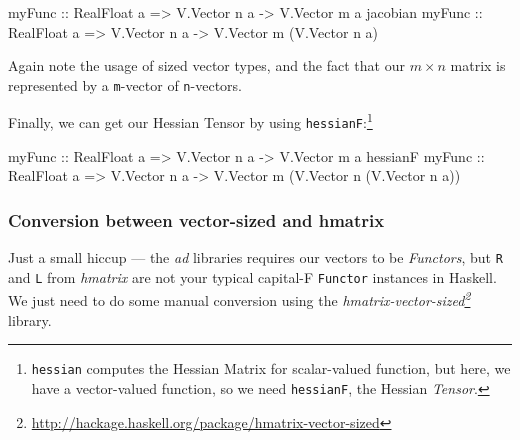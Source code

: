 \documentclass[]{article}
\newenvironment{Shaded}{}{}
\newcommand{\DataTypeTok}[1]{\textcolor[rgb]{0.56,0.13,0.00}{#1}}
\newcommand{\NormalTok}[1]{#1}
\newcommand{\OtherTok}[1]{\textcolor[rgb]{0.00,0.44,0.13}{#1}}
\renewcommand{\href}[2]{#2\footnote{\url{#1}}}
\begin{document}
\begin{Shaded}
\begin{Highlighting}[]
\OtherTok{myFunc          ::} \DataTypeTok{RealFloat}\NormalTok{ a }\OtherTok{=>} \DataTypeTok{V.Vector}\NormalTok{ n a }\OtherTok{{-}>} \DataTypeTok{V.Vector}\NormalTok{ m a}
\NormalTok{jacobian}\OtherTok{ myFunc ::} \DataTypeTok{RealFloat}\NormalTok{ a }\OtherTok{=>} \DataTypeTok{V.Vector}\NormalTok{ n a }\OtherTok{{-}>} \DataTypeTok{V.Vector}\NormalTok{ m (}\DataTypeTok{V.Vector}\NormalTok{ n a)}
\end{Highlighting}
\end{Shaded}

Again note the usage of sized vector types, and the fact that our \(m \times n\)
matrix is represented by a \texttt{m}-vector of \texttt{n}-vectors.

Finally, we can get our Hessian Tensor by using \texttt{hessianF}:\footnote{\texttt{hessian}
  computes the Hessian Matrix for scalar-valued function, but here, we have a
  vector-valued function, so we need \texttt{hessianF}, the Hessian
  \emph{Tensor}.}

\begin{Shaded}
\begin{Highlighting}[]
\NormalTok{myFunc}
\OtherTok{    ::} \DataTypeTok{RealFloat}\NormalTok{ a }\OtherTok{=>} \DataTypeTok{V.Vector}\NormalTok{ n a }\OtherTok{{-}>} \DataTypeTok{V.Vector}\NormalTok{ m a}
\NormalTok{hessianF myFunc}
\OtherTok{    ::} \DataTypeTok{RealFloat}\NormalTok{ a }\OtherTok{=>} \DataTypeTok{V.Vector}\NormalTok{ n a }\OtherTok{{-}>} \DataTypeTok{V.Vector}\NormalTok{ m (}\DataTypeTok{V.Vector}\NormalTok{ n (}\DataTypeTok{V.Vector}\NormalTok{ n a))}
\end{Highlighting}
\end{Shaded}

\hypertarget{conversion-between-vector-sized-and-hmatrix}{%
\subsubsection{Conversion between vector-sized and
hmatrix}\label{conversion-between-vector-sized-and-hmatrix}}

Just a small hiccup --- the \emph{ad} libraries requires our vectors to be
\emph{Functors}, but \texttt{R} and \texttt{L} from \emph{hmatrix} are not your
typical capital-F \texttt{Functor} instances in Haskell. We just need to do some
manual conversion using the
\emph{\href{http://hackage.haskell.org/package/hmatrix-vector-sized}{hmatrix-vector-sized}}
library.
\end{document}
